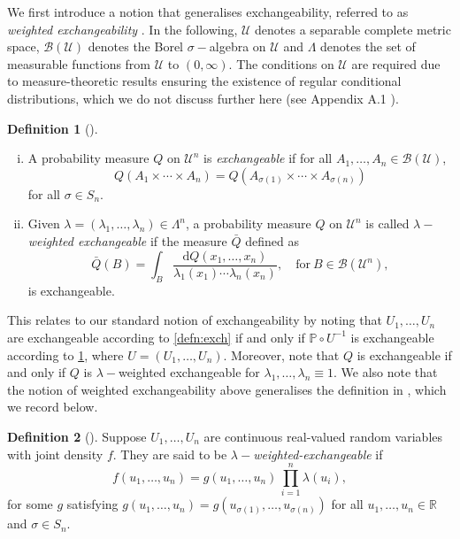 \documentclass[11pt, titlepage]{article} %
\newcommand{\R}{\mathrm}
\numberwithin{equation}{section}
\theoremstyle{definition}
\newtheorem{definition}{Definition}
\numberwithin{theorem}{section}
\numberwithin{lemma}{section}
\numberwithin{corollary}{section}
\numberwithin{proposition}{section}
\numberwithin{definition}{section}
\numberwithin{remark}{section}
\begin{document}
\noindent
We first introduce a notion that generalises exchangeability, referred to as \textit{weighted exchangeability} \cite{tibshirani2019covariateshift,barber2024finetti,tang2023finiteweighted}. In the following, \(\mathcal{U}\) denotes a separable complete metric space, \(\mathcal{B}(\mathcal{U})\) denotes the Borel \(\sigma-\)algebra on \(\mathcal{U}\) and \(\Lambda\) denotes the set of measurable functions from \(\mathcal{U}\) to \((0, \infty)\).  The conditions on \(\mathcal{U}\) are required due to measure-theoretic results ensuring the existence of regular conditional distributions, which we do not discuss further here (see Appendix A.1 \cite{barber2024finetti}). 

\begin{definition}[\cite{barber2024finetti,tang2023finiteweighted}]
    \begin{enumerate}[(i)] \itemsep0em
        \item A probability measure \(Q\) on \(\mathcal{U}^n\) is \textit{exchangeable} if for all \(A_1, \ldots, A_n \in \mathcal{B}(\mathcal{U})\), \[Q(A_1 \times \cdots \times A_n) = Q(A_{\sigma(1)} \times \cdots \times A_{\sigma(n)})\] for all \(\sigma \in S_n.\) 
        \item Given \(\lambda = (\lambda_1, \ldots, \lambda_n) \in \Lambda^n\), a probability measure \(Q\) on \(\mathcal{U}^n\) is called \(\lambda-\)\textit{weighted exchangeable} if the measure \(\bar{Q}\) defined as \[\bar{Q}(B) = \int_{B} \frac{\R{d}Q(x_1, \ldots, x_n)}{\lambda_1(x_1) \cdots \lambda_n(x_n)}, \quad \mathrm{for} \ B \in \mathcal{B}(\mathcal{U}^n), \] is exchangeable.
    \end{enumerate}
\label{defn:weighted_exch}
\end{definition}

\noindent
This relates to our standard notion of exchangeability by noting that \(U_1, \ldots, U_n\) are exchangeable according to \cref{defn:exch} if and only if \(\mathbb{P} \circ U^{-1}\) is exchangeable according to \cref{defn:weighted_exch}, where \(U = (U_1, \ldots, U_n)\). Moreover, note that \(Q\) is exchangeable if and only if \(Q\) is \(\lambda-\)weighted exchangeable for \(\lambda_1, \ldots, \lambda_n \equiv 1\). We also note that the notion of weighted exchangeability above generalises the definition in \cite{tibshirani2019covariateshift}, which we record below.

\begin{definition}[\cite{tibshirani2019covariateshift}]
    Suppose \(U_1, \ldots, U_n\) are continuous real-valued random variables with joint density \(f\). They are said to be \(\lambda-\)\textit{weighted-exchangeable} if \[f(u_1, \ldots, u_n) = g(u_1, \ldots, u_n) \, \prod_{i=1}^n \lambda(u_i),\] for some \(g\) satisfying \(g(u_1, \ldots, u_n) = g(u_{\sigma(1)}, \ldots, u_{\sigma(n)})\) for all \(u_1, \ldots, u_n \in \mathbb{R}\) and \(\sigma \in S_{n}\).
\label{defn:tibs_weighted_exch}
\end{definition}
\end{document}
